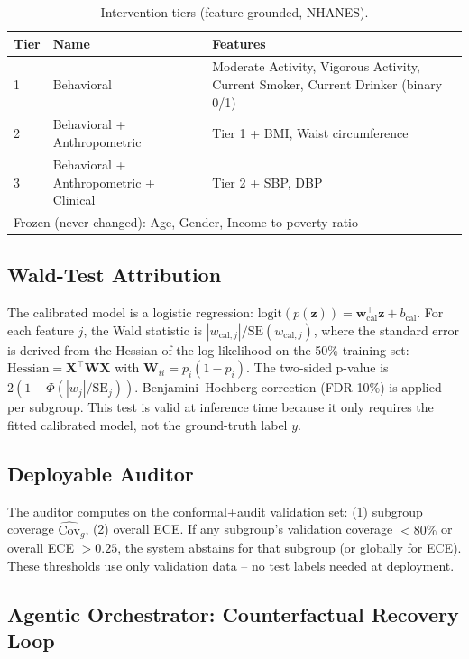 \documentclass[11pt,a4paper]{article}
\theoremstyle{plain}
\begin{document}
\begin{table}[htbp]
\centering
\caption{Intervention tiers (feature-grounded, NHANES).}
\label{tab:tiers}
\begin{tabular}{lp{5.5cm}p{4cm}}
\toprule
Tier & Name & Features \\
\midrule
1 & Behavioral & Moderate Activity, Vigorous Activity, Current Smoker, Current Drinker (binary 0/1) \\
2 & Behavioral + Anthropometric & Tier 1 + BMI, Waist circumference \\
3 & Behavioral + Anthropometric + Clinical & Tier 2 + SBP, DBP \\
\midrule
\multicolumn{3}{l}{Frozen (never changed): Age, Gender, Income-to-poverty ratio} \\
\bottomrule
\end{tabular}
\end{table}

\subsection{Wald-Test Attribution}
\label{sec:attribution}

The calibrated model is a logistic regression: $\text{logit}(p(\mathbf{z})) = \mathbf{w}_{\text{cal}}^\top \mathbf{z} + b_{\text{cal}}$. For each feature $j$, the Wald statistic is $|w_{\text{cal},j}| / \text{SE}(w_{\text{cal},j})$, where the standard error is derived from the Hessian of the log-likelihood on the 50\% training set: $\text{Hessian} = \mathbf{X}^\top \mathbf{W} \mathbf{X}$ with $\mathbf{W}_{ii} = p_i(1-p_i)$. The two-sided p-value is $2(1-\Phi(|w_j|/\text{SE}_j))$. Benjamini--Hochberg correction (FDR 10\%) is applied per subgroup. This test is valid at inference time because it only requires the fitted calibrated model, not the ground-truth label $y$.

\subsection{Deployable Auditor}
\label{sec:auditor}

The auditor computes on the conformal+audit validation set: (1) subgroup coverage $\widehat{\text{Cov}}_g$, (2) overall ECE. If any subgroup's validation coverage $< 80\%$ or overall ECE $> 0.25$, the system abstains for that subgroup (or globally for ECE). These thresholds use only validation data -- no test labels needed at deployment.

\subsection{Agentic Orchestrator: Counterfactual Recovery Loop}
\label{sec:orchestrator}
\end{document}
